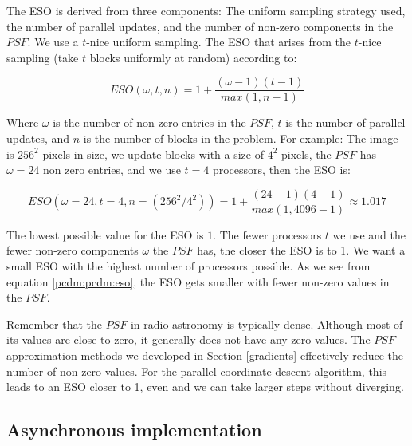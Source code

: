 The ESO is derived from three components: The uniform sampling strategy used, the number of parallel updates, and the number of non-zero components in the $PSF$. We use a $t$-nice uniform sampling. The ESO that arises from the $t$-nice sampling (take $t$ blocks uniformly at random) according to\cite{richtarik2016parallel}:

\begin{equation}\label{pcdm:pcdm:eso}
ESO(\omega, t, n) = 1+ \frac{(\omega - 1)(t - 1)}{max(1, n -1)}
\end{equation}

Where $\omega$ is the number of non-zero entries in the $PSF$, $t$ is the number of parallel updates, and $n$ is the number of blocks in the problem. For example: The image is $256^2$ pixels in size, we update blocks with a size of $4^2$ pixels, the $PSF$ has $\omega = 24$ non zero entries, and we use $t = 4$ processors, then the ESO is:

\begin{equation}
ESO(\omega = 24, t = 4, n = (256^2 / 4^2)) = 1+ \frac{(24 - 1)(4 - 1)}{max(1, 4096 -1)} \approx 1.017
\end{equation}

The lowest possible value for the ESO is $1$. The fewer processors $t$ we use and the fewer non-zero components $\omega$ the $PSF$ has, the closer the ESO is to 1. We want a small ESO with the highest number of processors possible. As we see from equation \eqref{pcdm:pcdm:eso}, the ESO gets smaller with fewer non-zero values in the $PSF$.

Remember that the $PSF$ in radio astronomy is typically dense. Although most of its values are close to zero, it generally does not have any zero values. The $PSF$ approximation methods we developed in Section \ref{gradients} effectively reduce the number of non-zero values. For the parallel coordinate descent algorithm, this leads to an ESO closer to 1, even  and we can take larger steps without diverging.



\subsection{Asynchronous implementation}\label{pcdm:async}


